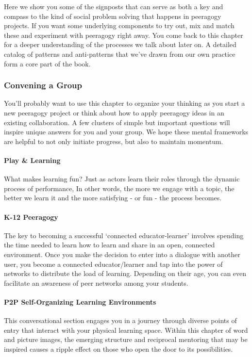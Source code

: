 \noindent Here we show you some of the signposts that can serve as
both a key and compass to the kind of social problem solving that
happens in peeragogy projects. If you want some underlying components
to try out, mix and match these and experiment with peeragogy right
away. You come back to this chapter for a deeper understanding of the
processes we talk about later on. A detailed catalog of patterns and
anti-patterns that we've drawn from our own practice form a core part
of the book.

\subsubsection{Convening a Group}

\noindent You'll probably want to use this chapter to organize your thinking as
you start a new peeragogy project or think about how to apply peeragogy
ideas in an existing collaboration. A few clusters of simple but
important questions will inspire unique answers for you and your group.
We hope these mental frameworks are helpful to not only initiate
progress, but also to maintain momentum.

 \paragraph{Play \& Learning} What
makes learning fun? Just as actors learn their roles through the dynamic
process of performance, In other words, the more we engage with a topic,
the better we learn it and the more satisfying - or fun - the process
becomes.

\paragraph{K-12 Peeragogy} The key to becoming a successful
`connected educator-learner' involves spending the time needed to learn
how to learn and share in an open, connected environment. Once you make
the decision to enter into a dialogue with another user, you become a
connected educator/learner and tap into the power of networks to
distribute the load of learning. Depending on their age, you can even
facilitate an awareness of peer networks among your students.

\paragraph{P2P Self-Organizing Learning Environments} This conversational
section engages you in a journey through diverse points of entry that
interact with your physical learning space. Within this chapter of word
and picture images, the emerging structure and reciprocal mentoring that
may be inspired causes a ripple effect on those who open the door to its
possibilities.

